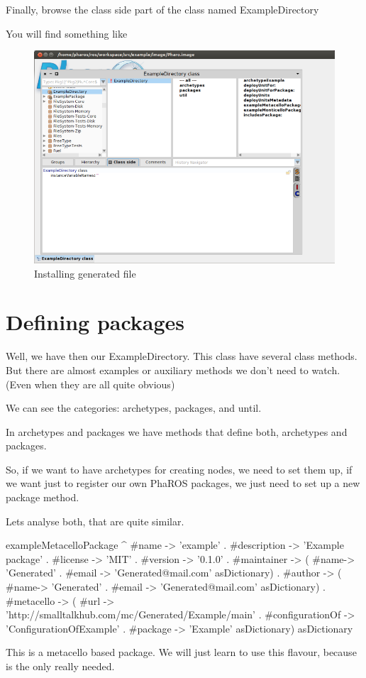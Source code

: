 \documentclass[a4paper,10pt,twoside]{book}
\begin{document}
					
					Finally, browse the class side part of the class named ExampleDirectory
					
					You will find something like 
					
					\begin{figure}[!htbp]
				  		\centering
					    		\includegraphics[width=1\textwidth]{ExampleDirectory.png}		
							\caption{Installing generated file}
						\centering
					\end{figure} 
					
					
					\section {Defining packages}
					
						Well, we have then our ExampleDirectory.  This class have several class methods. But there are almost examples or auxiliary methods we don't need to watch. (Even when they are all quite obvious)
						
						We can see the categories: archetypes, packages, and until. 
						
						In archetypes and packages we have methods that define both, archetypes and packages. 
						
						So, if we want to have archetypes for creating nodes, we need to set them up, if we want just to register our own PhaROS packages, we just need to set up a new package method. 
						
						Lets analyse both, that are quite similar.
						
						
						\begin{code}
exampleMetacelloPackage
	^ { 
			#name -> 'example' .
			#description -> 'Example package' . 
			#license ->  'MIT'  .
			#version -> '0.1.0' .
			#maintainer -> ({ 
				#name-> 'Generated' . 
				#email -> 'Generated@mail.com' 
			}  asDictionary) .
			#author -> ({  
				#name-> 'Generated' . 
				#email -> 'Generated@mail.com'  
			} asDictionary) .
			#metacello -> ({ 
				#url -> 'http://smalltalkhub.com/mc/Generated/Example/main' . 
				#configurationOf -> 'ConfigurationOfExample' . 
				#package -> 'Example'  
			} asDictionary)
		 } asDictionary 
	
						\end{code}
						This is a metacello based package. We will just learn to use this flavour, because is the only really needed. 
						
\end{document}
